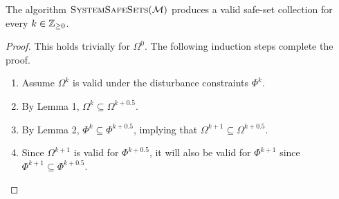 \begin{lemma}
The algorithm $\Call{SystemSafeSets}{\agents}$ produces a valid safe-set collection for every $k\in\mathbb{Z}_{\geq 0}$. 
\end{lemma}
\begin{proof}
This holds trivially for $\Omega^0$. The following induction steps complete the proof.
\begin{enumerate}
	\item Assume $\Omega^k$ is valid under the disturbance constraints $\Phi^k$.
	\item By Lemma 1, $\Omega^k\subseteq\Omega^{k+0.5}$.
	\item By Lemma 2, $\Phi^k\subseteq\Phi^{k+0.5}$, implying that $\Omega^{k+1}\subseteq\Omega^{k+0.5}$.
	\item Since $\Omega^{k+1}$ is valid for $\Phi^{k+0.5}$, it will also be valid for $\Phi^{k+1}$ since $\Phi^{k+1}\subseteq\Phi^{k+0.5}$.
\end{enumerate}
\end{proof}
